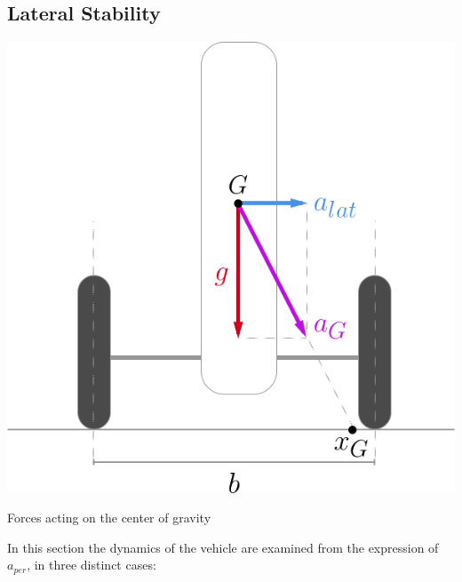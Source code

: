 \subsection{Lateral Stability}
\begin{marginfigure}[10cm]
	\includegraphics[width=1.2\linewidth]{figs/03/stability}
	\caption{Forces acting on the center of gravity}
	\label{stability}
\end{marginfigure}
In this section the dynamics of the vehicle are examined from the expression of $a_{per}$, in three distinct cases: 
